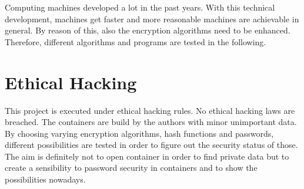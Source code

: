 Computing machines developed a lot in the past years. With this technical development, machines get faster and more reasonable machines are achievable in general. By reason of this, also the encryption algorithms need to be enhanced. Therefore, different algorithms and programs are tested in the following. 


\section{Ethical Hacking}
\label{sec:ethical}

This project is executed under ethical hacking rules. No ethical hacking laws are breached. The containers are build by the authors with minor unimportant data. By choosing varying encryption algorithms, hash functions and passwords, different possibilities are tested in order to figure out the security status of those. The aim is definitely not to open container in order to find private data but to create a sensibility to password security in containers and to show the possibilities nowadays. 
